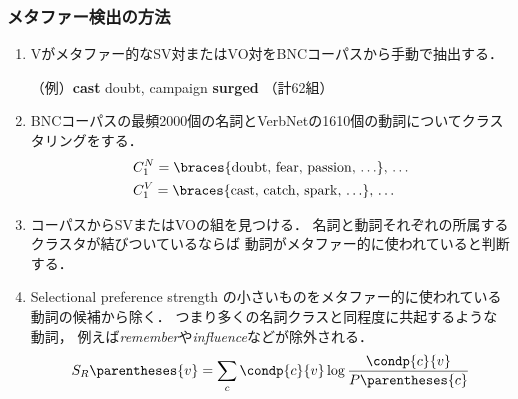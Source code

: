 \documentclass[11pt]{beamer}
\newlength{\la}
\newcommand\enumref[1]{\textcolor{sRed}{\ref{#1}}}
\newcommand\metaphorical[1]{\textcolor{sRed}{\textbf{#1}}}
\begin{document}
\begin{frame}[allowframebreaks]
\frametitle{メタファー検出の方法}
\setlength{\leftmargini}{0em}
\begin{enumerate}
    \item\label{seed} Vがメタファー的なSV対またはVO対をBNCコーパスから手動で抽出する．

        （例）\metaphorical{cast} doubt, campaign \metaphorical{surged} （計62組）

    \item BNCコーパスの最頻2000個の名詞とVerbNetの1610個の動詞についてクラスタリングをする．
        \begin{align*}
            & C_1^N = \braces{\mathrm{doubt},\,\mathrm{fear},\,\mathrm{passion},\, \ldots},\,\ldots \\
            & C_1^V = \braces{\mathrm{cast},\,\mathrm{catch},\,\mathrm{spark},\,\ldots},\,\ldots
        \end{align*}

    \item コーパスからSVまたはVOの組を見つける．
        名詞と動詞それぞれの所属するクラスタが結びついているならば
        動詞がメタファー的に使われていると判断する．

    \item Selectional preference strength
        の小さいものをメタファー的に使われている動詞の候補から除く．
        つまり多くの名詞クラスと同程度に共起するような動詞，
        例えば\emph{remember}や\emph{influence}などが除外される．
        \begin{align*}
            S_R\parentheses{v}
            = \sum_{c} \condp{c}{v}\log\frac{\condp{c}{v}}{P\parentheses{c}}
        \end{align*}
\end{enumerate}
\end{frame}
\end{document}
